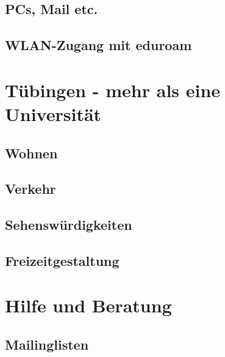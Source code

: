 \documentclass[12pt, a4paper]{article}
\newif\ifinfo
\begin{document}
\pagebreak
\subsection{PCs, Mail etc.}
	
\subsection{WLAN-Zugang mit eduroam}
	

\section{Tübingen - mehr als eine Universität}
\subsection{Wohnen}


\subsection{Verkehr}


\subsection{Sehenswürdigkeiten}

\pagebreak
\subsection{Freizeitgestaltung}


\newpage
\section{Hilfe und Beratung}
\ifinfo
	\subsection{Don't panic! -- Erste Hilfe: fsi}
	
\else
	
\fi

\subsection{Mailinglisten}
\ifinfo
	
\else
	
\fi
\end{document}
